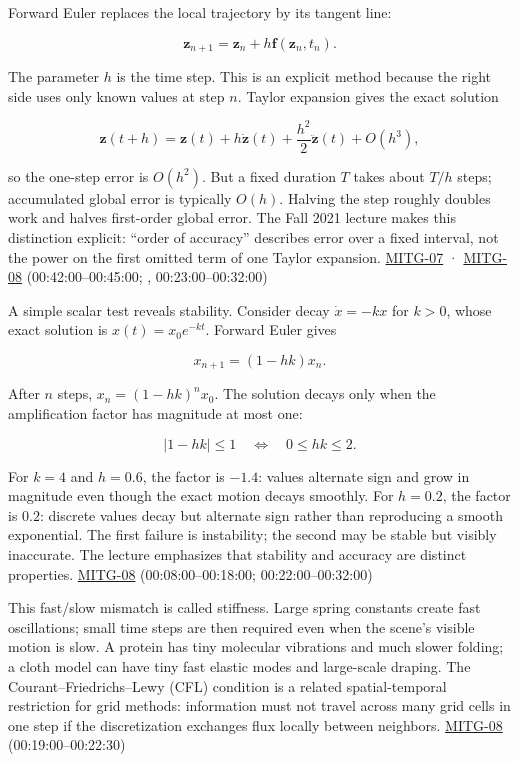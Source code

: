 Forward Euler replaces the local trajectory by its tangent line:

\[
\boldsymbol{z}_{n+1}=\boldsymbol{z}_n+h\boldsymbol{f}(\boldsymbol{z}_n,t_n).
\]

The parameter \(h\) is the time step. This is an explicit method because the right side uses only known values at step \(n\). Taylor expansion gives the exact solution

\[
\boldsymbol{z}(t+h)=\boldsymbol{z}(t)+h\dot{\boldsymbol{z}}(t)
+\frac{h^2}{2}\ddot{\boldsymbol{z}}(t)+O(h^3),
\]

so the one-step error is \(O(h^2)\). But a fixed duration \(T\) takes about \(T/h\) steps; accumulated global error is typically \(O(h)\). Halving the step roughly doubles work and halves first-order global error. The Fall 2021 lecture makes this distinction explicit: ``order of accuracy'' describes error over a fixed interval, not the power on the first omitted term of one Taylor expansion. \hyperref[04-visual-computing-ii-ch036]{MITG-07} · \hyperref[04-visual-computing-ii-ch036]{MITG-08} (00:42:00--00:45:00; , 00:23:00--00:32:00)

A simple scalar test reveals stability. Consider decay \(\dot{x}=-kx\) for \(k>0\), whose exact solution is \(x(t)=x_0e^{-kt}\). Forward Euler gives

\[
x_{n+1}=(1-hk)x_n.
\]

After \(n\) steps, \(x_n=(1-hk)^nx_0\). The solution decays only when the amplification factor has magnitude at most one:

\[
|1-hk|\le1\quad\Longleftrightarrow\quad 0\le hk\le2.
\]

For \(k=4\) and \(h=0.6\), the factor is \(-1.4\): values alternate sign and grow in magnitude even though the exact motion decays smoothly. For \(h=0.2\), the factor is \(0.2\): discrete values decay but alternate sign rather than reproducing a smooth exponential. The first failure is instability; the second may be stable but visibly inaccurate. The lecture emphasizes that stability and accuracy are distinct properties. \hyperref[04-visual-computing-ii-ch036]{MITG-08} (00:08:00--00:18:00; 00:22:00--00:32:00)

This fast/slow mismatch is called stiffness. Large spring constants create fast oscillations; small time steps are then required even when the scene's visible motion is slow. A protein has tiny molecular vibrations and much slower folding; a cloth model can have tiny fast elastic modes and large-scale draping. The Courant--Friedrichs--Lewy (CFL) condition is a related spatial-temporal restriction for grid methods: information must not travel across many grid cells in one step if the discretization exchanges flux locally between neighbors. \hyperref[04-visual-computing-ii-ch036]{MITG-08} (00:19:00--00:22:30)

